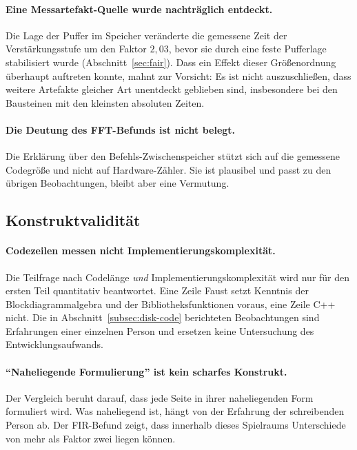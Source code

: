 \paragraph{Eine Messartefakt-Quelle wurde nachträglich entdeckt.}
Die Lage der Puffer im Speicher veränderte die gemessene Zeit der Verstärkungsstufe um den Faktor $2{,}03$, bevor sie durch eine feste Pufferlage stabilisiert wurde (Abschnitt~\ref{sec:fair}). Dass ein Effekt dieser Größenordnung überhaupt auftreten konnte, mahnt zur Vorsicht: Es ist nicht auszuschließen, dass weitere Artefakte gleicher Art unentdeckt geblieben sind, insbesondere bei den Bausteinen mit den kleinsten absoluten Zeiten.

\paragraph{Die Deutung des FFT-Befunds ist nicht belegt.}
Die Erklärung über den Befehls-Zwischenspeicher stützt sich auf die gemessene Codegröße und nicht auf Hardware-Zähler. Sie ist plausibel und passt zu den übrigen Beobachtungen, bleibt aber eine Vermutung.

\subsection{Konstruktvalidität}

\paragraph{Codezeilen messen nicht Implementierungskomplexität.}
Die Teilfrage nach Codelänge \emph{und} Implementierungskomplexität wird nur für den ersten Teil quantitativ beantwortet. Eine Zeile Faust setzt Kenntnis der Blockdiagrammalgebra und der Bibliotheksfunktionen voraus, eine Zeile C++ nicht. Die in Abschnitt~\ref{subsec:disk-code} berichteten Beobachtungen sind Erfahrungen einer einzelnen Person und ersetzen keine Untersuchung des Entwicklungsaufwands.

\paragraph{\enquote{Naheliegende Formulierung} ist kein scharfes Konstrukt.}
Der Vergleich beruht darauf, dass jede Seite in ihrer naheliegenden Form formuliert wird. Was naheliegend ist, hängt von der Erfahrung der schreibenden Person ab. Der FIR-Befund zeigt, dass innerhalb dieses Spielraums Unterschiede von mehr als Faktor zwei liegen können.

